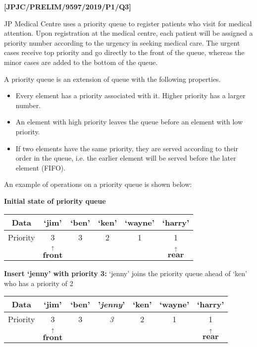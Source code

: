 \item \textbf{{[}JPJC/PRELIM/9597/2019/P1/Q3{]} }

JP Medical Centre uses a priority queue to register patients who visit
for medical attention. Upon registration at the medical centre, each
patient will be assigned a priority number according to the urgency
in seeking medical care. The urgent cases receive top priority and
go directly to the front of the queue, whereas the minor cases are
added to the bottom of the queue.

A priority queue is an extension of queue with the following properties.
\begin{itemize}
\item Every element has a priority associated with it. Higher priority has
a larger number. 
\item An element with high priority leaves the queue before an element with
low priority.
\item If two elements have the same priority, they are served according
to their order in the queue, i.e. the earlier element will be served
before the later element (FIFO). 
\end{itemize}
An example of operations on a priority queue is shown below:

\textbf{Initial state of priority queue} 

\begin{tabular}{|c|c|c|c|c|c|}
\hline 
Data & \textquoteleft jim\textquoteright{} & \textquoteleft ben\textquoteright{} & \textquoteleft ken\textquoteright{} & \textquoteleft wayne\textquoteright{} & \textquoteleft harry\textquoteright{}\tabularnewline
\hline 
Priority & 3 & 3 & 2 & 1 & 1\tabularnewline
\hline 
\multicolumn{1}{c}{} & \multicolumn{1}{c}{$\overset{\uparrow}{\boldsymbol{\text{front}}}$} & \multicolumn{1}{c}{} & \multicolumn{1}{c}{} & \multicolumn{1}{c}{} & \multicolumn{1}{c}{$\overset{\uparrow}{\boldsymbol{\text{rear}}}$}\tabularnewline
\end{tabular}

\textbf{Insert \textquoteleft jenny\textquoteright{} with priority
3:} \textquoteleft jenny\textquoteright{} joins the priority queue
ahead of \textquoteleft ken\textquoteright{} who has a priority of
2 

\begin{tabular}{|c|c|c|c|c|c|c|}
\hline 
Data & \textquoteleft jim\textquoteright{} & \textquoteleft ben\textquoteright{} & '\emph{jenny}' & \textquoteleft ken\textquoteright{} & \textquoteleft wayne\textquoteright{} & \textquoteleft harry\textquoteright{}\tabularnewline
\hline 
Priority & 3 & 3 & \emph{3} & 2 & 1 & 1\tabularnewline
\hline 
\multicolumn{1}{c}{} & \multicolumn{1}{c}{$\overset{\uparrow}{\boldsymbol{\text{front}}}$} & \multicolumn{1}{c}{} & \multicolumn{1}{c}{} & \multicolumn{1}{c}{} & \multicolumn{1}{c}{} & \multicolumn{1}{c}{$\overset{\uparrow}{\boldsymbol{\text{rear}}}$}\tabularnewline
\end{tabular}

